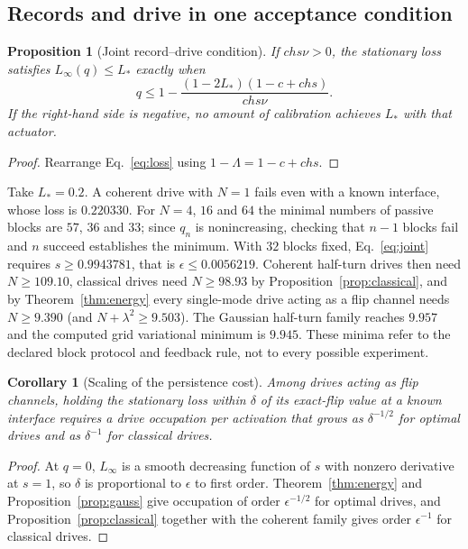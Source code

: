 \documentclass[aps,pre,onecolumn,superscriptaddress,floatfix,longbibliography]{revtex4-2}
\newtheorem{proposition}[theorem]{Proposition}
\newtheorem{corollary}[theorem]{Corollary}
\begin{document}
\subsection{Records and drive in one acceptance condition}

\begin{proposition}[Joint record--drive condition]
\label{prop:joint}
If $chs\nu>0$, the stationary loss satisfies $L_\infty(q)\le L_*$ exactly when
\begin{equation}
q\le1-\frac{(1-2L_*)(1-c+chs)}{chs\nu}.
\label{eq:joint}
\end{equation}
If the right-hand side is negative, no amount of calibration achieves $L_*$ with that actuator.
\end{proposition}

\begin{proof}
Rearrange Eq.~\eqref{eq:loss} using $1-\Lambda=1-c+chs$.
\end{proof}

Take $L_*=0.2$. A coherent drive with $N=1$ fails even with a known interface, whose loss is $0.220330$. For $N=4$, $16$ and $64$ the minimal numbers of passive blocks are $57$, $36$ and $33$; since $q_n$ is nonincreasing, checking that $n-1$ blocks fail and $n$ succeed establishes the minimum. With $32$ blocks fixed, Eq.~\eqref{eq:joint} requires $s\ge0.9943781$, that is $\epsilon\le0.0056219$. Coherent half-turn drives then need $N\ge109.10$, classical drives need $N\ge98.93$ by Proposition~\ref{prop:classical}, and by Theorem~\ref{thm:energy} every single-mode drive acting as a flip channel needs $N\ge9.390$ (and $N+\lambda^2\ge9.503$). The Gaussian half-turn family reaches $9.957$ and the computed grid variational minimum is $9.945$. These minima refer to the declared block protocol and feedback rule, not to every possible experiment.

\begin{corollary}[Scaling of the persistence cost]
\label{cor:scaling}
Among drives acting as flip channels, holding the stationary loss within $\delta$ of its exact-flip value at a known interface requires a drive occupation per activation that grows as $\delta^{-1/2}$ for optimal drives and as $\delta^{-1}$ for classical drives.
\end{corollary}

\begin{proof}
At $q=0$, $L_\infty$ is a smooth decreasing function of $s$ with nonzero derivative at $s=1$, so $\delta$ is proportional to $\epsilon$ to first order. Theorem~\ref{thm:energy} and Proposition~\ref{prop:gauss} give occupation of order $\epsilon^{-1/2}$ for optimal drives, and Proposition~\ref{prop:classical} together with the coherent family gives order $\epsilon^{-1}$ for classical drives.
\end{proof}
\end{document}
